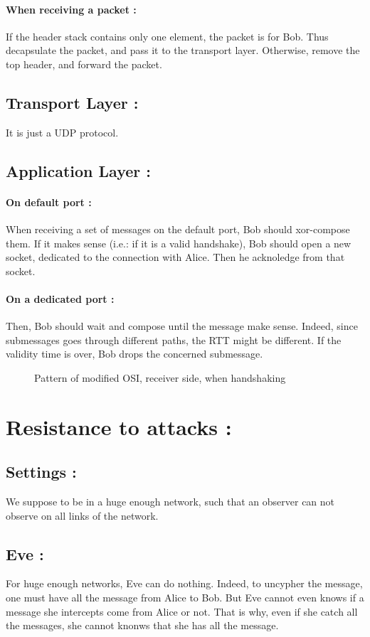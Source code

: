 \documentclass[a4paper, onecolumn, 10pt]{article}
\numberwithin{equation}{section}
\begin{document}
\paragraph{When receiving a packet :}
If the header stack contains only one element, the packet is for Bob. Thus decapsulate the packet, and pass it to the transport layer. Otherwise, remove the top header, and forward the packet. 
\subsection{Transport Layer :}
It is just a UDP protocol.
\subsection{Application Layer :}
\paragraph{On default port :}
When receiving a set of messages on the default port, Bob should xor-compose them. If it makes sense (i.e.: if it is a valid handshake), Bob should open a new socket, dedicated to the connection with Alice. Then he acknoledge from that socket. 
\paragraph{On a dedicated port :}
Then, Bob should wait and compose until the message make sense. Indeed, since submessages goes through different paths, the RTT might be different. If the validity time is over, Bob drops the concerned submessage.
\begin{figure}
  \centering
  \begingroup
  
  \endgroup
  \caption{Pattern of modified OSI, receiver side, when handshaking}
  \label{fig:OSImodified2}
\end{figure}

\section{Resistance to attacks :}
\subsection{Settings :}
We suppose to be in a huge enough network, such that an observer can not observe on all links of the network.
\subsection{Eve :}
For huge enough networks, Eve can do nothing. Indeed, to uncypher the message, one must have all the message from Alice to Bob. But Eve cannot even knows if a message she intercepts come from Alice or not. That is why, even if she catch all the messages, she cannot knonws that she has all the message. 
\end{document}
